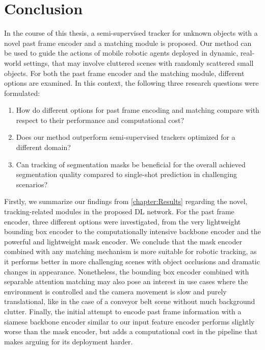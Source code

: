 \chapter{Conclusion}\label{chapter:conclusion}

In the course of this thesis, a semi-supervised tracker for unknown objects with a novel past frame encoder and a matching module is proposed. Our method can be used to guide the actions of mobile robotic agents deployed in dynamic, real-world settings, that may involve cluttered scenes with randomly scattered small objects. 
For both the past frame encoder and the matching module, different options are examined. In this context, the following three research questions were formulated:

\begin{enumerate}
    \item How do different options for past frame encoding and matching compare with respect to their performance and computational cost? 
    \item Does our method outperform semi-supervised trackers optimized for a different domain?
    \item Can tracking of segmentation masks be beneficial for the overall achieved segmentation quality compared to single-shot prediction in challenging scenarios?
\end{enumerate}

Firstly, we summarize our findings from \autoref{chapter:Results} regarding the novel, tracking-related modules in the proposed DL network. 
For the past frame encoder, three different options were investigated, from the very lightweight bounding box encoder to the computationally intensive backbone encoder and the powerful and lightweight mask encoder. 
We conclude that the mask encoder combined with any matching mechanism is more suitable for robotic tracking, as it performs better in more challenging scenes with object occlusions and dramatic changes in appearance. 
Nonetheless, the bounding box encoder combined with separable attention matching may also pose an interest in use cases where the environment is controlled and the camera movement is slow and purely translational, like in the case of a conveyor belt scene without much background clutter. Finally, the initial attempt to encode past frame information with a siamese backbone encoder similar to our input feature encoder performs slightly worse than the mask encoder, but adds a computational cost in the pipeline that makes arguing for its deployment harder.  \par

